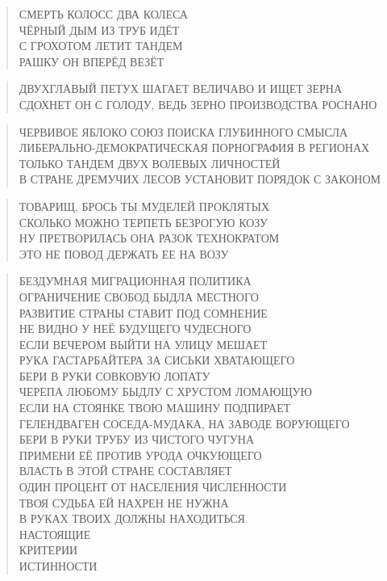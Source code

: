 \poemtitle{***}
\begin{verse}
СМЕРТЬ КОЛОСС ДВА КОЛЕСА\\
ЧЁРНЫЙ ДЫМ ИЗ ТРУБ ИДЁТ\\
С ГРОХОТОМ ЛЕТИТ ТАНДЕМ\\
РАШКУ ОН ВПЕРЁД ВЕЗЁТ
\end{verse}

\poemtitle{***}
\begin{verse}
ДВУХГЛАВЫЙ ПЕТУХ ШАГАЕТ ВЕЛИЧАВО И ИЩЕТ ЗЕРНА\\
СДОХНЕТ ОН С ГОЛОДУ, ВЕДЬ ЗЕРНО ПРОИЗВОДСТВА РОСНАНО
\end{verse}

\poemtitle{***}
\begin{verse}
ЧЕРВИВОЕ ЯБЛОКО СОЮЗ ПОИСКА ГЛУБИННОГО СМЫСЛА\\
ЛИБЕРАЛЬНО-ДЕМОКРАТИЧЕСКАЯ ПОРНОГРАФИЯ В РЕГИОНАХ\\
ТОЛЬКО ТАНДЕМ ДВУХ ВОЛЕВЫХ ЛИЧНОСТЕЙ\\
В СТРАНЕ ДРЕМУЧИХ ЛЕСОВ УСТАНОВИТ ПОРЯДОК С ЗАКОНОМ
\end{verse}

\poemtitle{***}
\begin{verse}
ТОВАРИЩ, БРОСЬ ТЫ МУДЕЛЕЙ ПРОКЛЯТЫХ\\
СКОЛЬКО МОЖНО ТЕРПЕТЬ БЕЗРОГУЮ КОЗУ\\
НУ ПРЕТВОРИЛАСЬ ОНА РАЗОК ТЕХНОКРАТОМ\\
ЭТО НЕ ПОВОД ДЕРЖАТЬ ЕЕ НА ВОЗУ
\end{verse}

\poemtitle{***}
\begin{verse}
БЕЗДУМНАЯ МИГРАЦИОННАЯ ПОЛИТИКА\\
ОГРАНИЧЕНИЕ СВОБОД БЫДЛА МЕСТНОГО\\
РАЗВИТИЕ СТРАНЫ СТАВИТ ПОД СОМНЕНИЕ\\
НЕ ВИДНО У НЕЁ БУДУЩЕГО ЧУДЕСНОГО\\
ЕСЛИ ВЕЧЕРОМ ВЫЙТИ НА УЛИЦУ МЕШАЕТ\\
РУКА ГАСТАРБАЙТЕРА ЗА СИСЬКИ ХВАТАЮЩЕГО\\
БЕРИ В РУКИ СОВКОВУЮ ЛОПАТУ\\
ЧЕРЕПА ЛЮБОМУ БЫДЛУ С ХРУСТОМ ЛОМАЮЩУЮ\\
ЕСЛИ НА СТОЯНКЕ ТВОЮ МАШИНУ ПОДПИРАЕТ\\
ГЕЛЕНДВАГЕН СОСЕДА-МУДАКА, НА ЗАВОДЕ ВОРУЮЩЕГО\\
БЕРИ В РУКИ ТРУБУ ИЗ ЧИСТОГО ЧУГУНА\\
ПРИМЕНИ ЕЁ ПРОТИВ УРОДА ОЧКУЮЩЕГО\\
ВЛАСТЬ В ЭТОЙ СТРАНЕ СОСТАВЛЯЕТ\\
ОДИН ПРОЦЕНТ ОТ НАСЕЛЕНИЯ ЧИСЛЕННОСТИ\\
ТВОЯ СУДЬБА ЕЙ НАХРЕН НЕ НУЖНА\\
В РУКАХ ТВОИХ ДОЛЖНЫ НАХОДИТЬСЯ \\
    НАСТОЯЩИЕ \\
        КРИТЕРИИ \\
            ИСТИННОСТИ
\end{verse}

